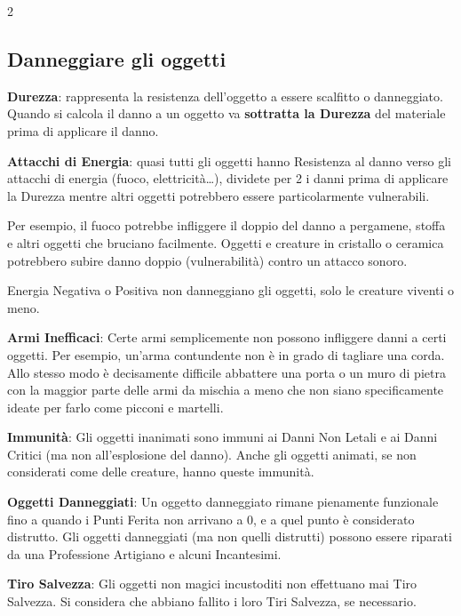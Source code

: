 \begin{multicols}{2}

\subsection{Danneggiare gli oggetti}

\textbf{Durezza}: rappresenta la resistenza dell'oggetto a essere scalfitto o danneggiato. Quando si calcola il danno a un oggetto va \textbf{sottratta la Durezza} del materiale prima di applicare il danno.

\textbf{Attacchi di Energia}: quasi tutti gli oggetti hanno Resistenza al danno verso gli attacchi di energia (fuoco, elettricità…), dividete per 2 i danni prima di applicare la Durezza mentre altri oggetti potrebbero essere particolarmente vulnerabili.

Per esempio, il fuoco potrebbe infliggere il doppio del danno a pergamene, stoffa e altri oggetti che bruciano facilmente. Oggetti e creature in cristallo o ceramica potrebbero subire danno doppio (vulnerabilità) contro un attacco sonoro.

Energia Negativa o Positiva non danneggiano gli oggetti, solo le creature viventi o meno.

\textbf{Armi Inefficaci}: Certe armi semplicemente non possono infliggere danni a certi oggetti. Per esempio, un'arma contundente non è in grado di tagliare una corda.
Allo stesso modo è decisamente difficile abbattere una porta o un muro di pietra con la maggior parte delle armi da mischia a meno che non siano specificamente ideate per farlo come picconi e martelli.

\textbf{Immunità}: Gli oggetti inanimati sono immuni ai Danni Non Letali e ai Danni Critici (ma non all'esplosione del danno). Anche gli oggetti animati, se non considerati come delle creature, hanno queste immunità.

\textbf{Oggetti Danneggiati}: Un oggetto danneggiato rimane pienamente funzionale fino a quando i Punti Ferita non arrivano a 0, e a quel punto è considerato distrutto. Gli oggetti danneggiati (ma non quelli distrutti) possono essere riparati da una Professione Artigiano e alcuni Incantesimi.

\textbf{Tiro Salvezza}: Gli oggetti non magici incustoditi non effettuano mai Tiro Salvezza. Si considera che abbiano fallito i loro Tiri Salvezza, se necessario.


\end{multicols}
